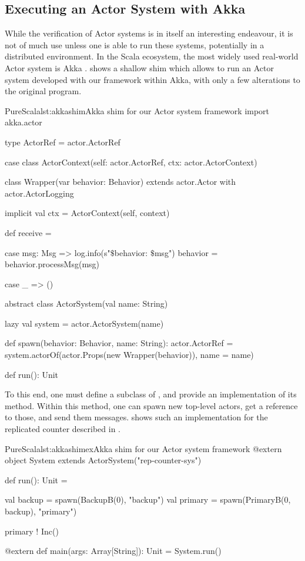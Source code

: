 \subsection{Executing an Actor System with Akka}
\label{akka}

While the verification of Actor systems is in itself an interesting endeavour, it is not of much use unless one is able to run these systems, potentially in a distributed environment. In the Scala ecosystem, the most widely used real-world Actor system is Akka .  shows a shallow shim which allows to run an Actor system developed with our framework within Akka, with only a few alterations to the original program.

\begin{Code}{PureScala}{lst:akkashim}{Akka shim for our Actor system framework}
import akka.actor

type ActorRef = actor.ActorRef

case class ActorContext(self: actor.ActorRef, ctx: actor.ActorContext)

class Wrapper(var behavior: Behavior)
  extends actor.Actor with actor.ActorLogging {

  implicit val ctx = ActorContext(self, context)

  def receive = {
    case msg: Msg =>
      log.info(s"$\$${behavior}: $\$${msg}")
      behavior = behavior.processMsg(msg)

    case _ => ()
  }
}

abstract class ActorSystem(val name: String) {
  lazy val system = actor.ActorSystem(name)

  def spawn(behavior: Behavior, name: String): actor.ActorRef = {
    system.actorOf(actor.Props(new Wrapper(behavior)), name = name)
  }

  def run(): Unit
}
\end{Code}


To this end, one must define a subclass of , and provide an implementation of its  method. Within this method, one can spawn new top-level actors, get a reference to those, and send them messages.  shows such an implementation for the replicated counter described in . 

\begin{Code}{PureScala}{lst:akkashimex}{Akka shim for our Actor system framework}
@extern
object System extends ActorSystem("rep-counter-sys") {
  def run(): Unit = {
    val backup  = spawn(BackupB(0), "backup")
    val primary = spawn(PrimaryB(0, backup), "primary")

    primary ! Inc()
  }
}

@extern
def main(args: Array[String]): Unit = {
  System.run()
}
\end{Code}

